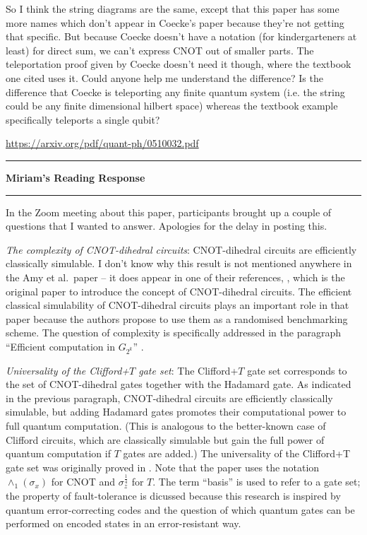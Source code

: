 \documentclass{amsart}
\newcommand{\iam}[1]{
  \vspace{0.25em}
  \hrule
  \vspace{0.25em}
  \textbf{{#1}'s Reading Response}
  \vspace{0.25em}
  \hrule
  \vspace{1em}
}
\begin{document}
So I think the string diagrams are the same, except that this paper has some more names which don't appear in Coecke's paper because they're not getting that specific. But because Coecke doesn't have a notation (for kindergarteners at least) for direct sum, we can't express CNOT out of smaller parts. The teleportation proof given by Coecke doesn't need it though, where the textbook one cited uses it. Could anyone help me understand the difference? Is the difference that Coecke is teleporting any finite quantum system (i.e. the string could be any finite dimensional hilbert space) whereas the textbook example specifically teleports a single qubit?


\url{https://arxiv.org/pdf/quant-ph/0510032.pdf}


\iam{Miriam}

In the Zoom meeting about this paper, participants brought up a couple of questions that I wanted to answer. Apologies for the delay in posting this.

\textit{The complexity of CNOT-dihedral circuits}: CNOT-dihedral circuits are efficiently classically simulable. I don't know why this result is not mentioned anywhere in the Amy et al.\ paper -- it does appear in one of their references, \cite{Scalablerandomised}, which is the original paper to introduce the concept of CNOT-dihedral circuits.
The efficient classical simulability of CNOT-dihedral circuits plays an important role in that paper because the authors propose to use them as a randomised benchmarking scheme. The question of complexity is specifically addressed in the paragraph ``Efficient computation in $G_{2^k}$'' \cite[p.~3]{Scalablerandomised}.

\textit{Universality of the Clifford+$T$ gate set}: The Clifford+$T$ gate set corresponds to the set of CNOT-dihedral gates together with the Hadamard gate.
As indicated in the previous paragraph, CNOT-dihedral circuits are efficiently classically simulable, but adding Hadamard gates promotes their computational power to full quantum computation. (This is analogous to the better-known case of Clifford circuits, which are classically simulable but gain the full power of quantum computation if $T$ gates are added.)
The universality of the Clifford+T gate set was originally proved in \cite{universalfaulttolerant}. Note that the paper uses the notation $\wedge_1(\sigma_x)$ for CNOT and $\sigma_z^{\frac{1}{4}}$ for $T$.
The term ``basis'' is used to refer to a gate set; the property of fault-tolerance is dicussed because this research is inspired by quantum error-correcting codes and the question of which quantum gates can be performed on encoded states in an error-resistant way.
\end{document}
